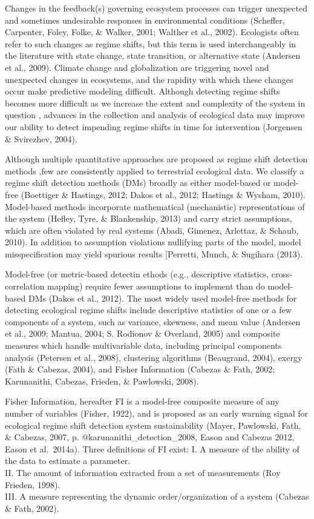 \documentclass[12pt,twoside,openany]{reedthesis}
\begin{document}
Changes in the feedback(s) governing ecosystem processes can trigger unexpected and sometimes undesirable responses in environmental conditions (Scheffer, Carpenter, Foley, Folke, \& Walker, 2001; Walther et al., 2002). Ecologists often refer to such changes as regime shifts, but this term is used interchangeably in the literature with state change, state transition, or alternative state (Andersen et al., 2009). Climate change and globalization are triggering novel and unexpected changes in ecosystems, and the rapidity with which these changes occur make predictive modeling difficult. Although detecting regime shifts becomes more difficult as we increase the extent and complexity of the system in question , advances in the collection and analysis of ecological data may improve our ability to detect impending regime shifts in time for intervention (Jorgensen \& Svirezhev, 2004).

Although multiple quantitative approaches are proposed as regime shift detection methods ,few are consistently applied to terrestrial ecological data. We classify a regime shift detection methods (DMs) broadly as either model-based or model-free (Boettiger \& Hastings, 2012; Dakos et al., 2012; Hastings \& Wysham, 2010). Model-based methods incorporate mathematical (mechanistic) representations of the system (Hefley, Tyre, \& Blankenship, 2013) and carry strict assumptions, which are often violated by real systems (Abadi, Gimenez, Arlettaz, \& Schaub, 2010). In addition to assumption violations nullifying parts of the model, model misspecification may yield spurious results {[}Perretti, Munch, \& Sugihara (2013).

Model-free (or metric-based detectin ethods (e.g., descriptive statistics, cross-correlation mapping) require fewer assumptions to implement than do model-based DMs (Dakos et al., 2012). The most widely used model-free methods for detecting ecological regime shifts include descriptive statistics of one or a few components of a system, such as variance, skewness, and mean value (Andersen et al., 2009; Mantua, 2004; S. Rodionov \& Overland, 2005) and composite measures which handle multivariable data, including principal components analysis (Petersen et al., 2008), clustering algorithms (Beaugrand, 2004), exergy (Fath \& Cabezas, 2004), and Fisher Information (Cabezas \& Fath, 2002; Karunanithi, Cabezas, Frieden, \& Pawlowski, 2008).

Fisher Information, hereafter FI is a model-free composite measure of any number of variables (Fisher, 1922), and is proposed as an early warning signal for ecological regime shift detection system sustainability (Mayer, Pawlowski, Fath, \& Cabezas, 2007, p. @karunanithi\_detection\_2008, Eason and Cabezas 2012, Eason et al.~2014a). Three definitions of FI exist:
I. A measure of the ability of the data to estimate a parameter.\\
II. The amount of information extracted from a set of measurements (Roy Frieden, 1998).\\
III. A measure representing the dynamic order/organization of a system (Cabezas \& Fath, 2002).
\end{document}
